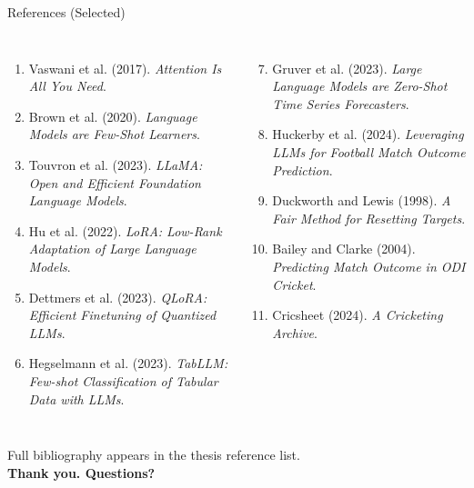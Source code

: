 \documentclass[aspectratio=169,10pt]{beamer}
\begin{document}
\begin{frame}{References (Selected)}
\scriptsize
\begin{columns}[T,onlytextwidth]
  \begin{enumerate}
    \item Vaswani et al. (2017). \textit{Attention Is All You Need}.
    \item Brown et al. (2020). \textit{Language Models are Few-Shot Learners}.
    \item Touvron et al. (2023). \textit{LLaMA: Open and Efficient Foundation Language Models}.
    \item Hu et al. (2022). \textit{LoRA: Low-Rank Adaptation of Large Language Models}.
    \item Dettmers et al. (2023). \textit{QLoRA: Efficient Finetuning of Quantized LLMs}.
    \item Hegselmann et al. (2023). \textit{TabLLM: Few-shot Classification of Tabular Data with LLMs}.
  \end{enumerate}

  \begin{enumerate}
    \setcounter{enumi}{6}
    \item Gruver et al. (2023). \textit{Large Language Models are Zero-Shot Time Series Forecasters}.
    \item Huckerby et al. (2024). \textit{Leveraging LLMs for Football Match Outcome Prediction}.
    \item Duckworth and Lewis (1998). \textit{A Fair Method for Resetting Targets}.
    \item Bailey and Clarke (2004). \textit{Predicting Match Outcome in ODI Cricket}.
    \item Cricsheet (2024). \textit{A Cricketing Archive}.
  \end{enumerate}
\end{columns}

\vspace{0.35cm}
\begin{center}
\small Full bibliography appears in the thesis reference list.\\[0.15cm]
\Large\textbf{Thank you. Questions?}
\end{center}
\end{frame}
\end{document}
